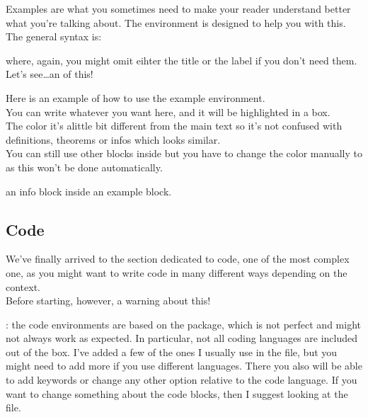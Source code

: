\documentclass[../main.tex]{subfiles}
\begin{document}
Examples are what you sometimes need to make your reader understand better what
you're talking about. The  environment is designed to help you with
this. The general syntax is:

\begin{center}
\end{center}

where, again, you might omit eihter the title or the label if you don't need them.\\
Let's see\dots an  of this! 

\begin{example}
	Here is an example of how to use the example environment.\\
	You can write whatever you want here, and it will be highlighted in a box.\\
	The color it's alittle bit different from the main text so it's not confused
	with definitions, theorems or infos which looks similar.\\
	You can still use other blocks inside but you have to change the color
	manually to  as this won't be done automatically.
	\begin{info}
		 an info block inside an example block.
	\end{info}
\end{example}


\pagebreak
\subsection{Code}

We've finally arrived to the section dedicated to code, one of the most complex
one, as you might want to write code in many different ways depending on the context.\\
Before starting, however, a warning about this!

\begin{warning}
	: the code environments are based on the  package,
	which is not perfect and might not always work as expected. In particular,
	not all coding languages are included out of the box. I've added a few of
	the ones I usually use in the  file, but you might need
	to add more if you use different languages. There you also will be able to
	add keywords or change any other option relative to the code language. If you want to change something about the code blocks, then I suggest looking at the  file.
\end{warning}
\end{document}
